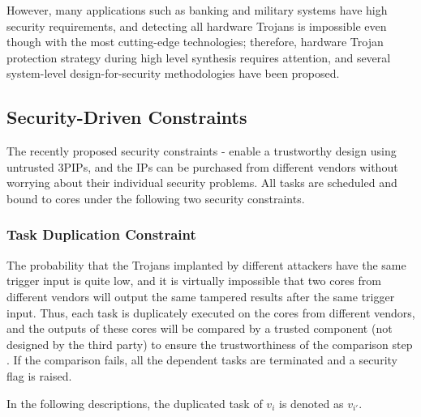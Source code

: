 \documentclass[10pt,journal]{IEEEtran}
\begin{document}

However, many applications such as banking and military systems have high security requirements, and detecting all hardware Trojans is impossible even though with the most cutting-edge technologies; therefore, hardware Trojan protection strategy during high level synthesis requires attention, and several system-level design-for-security methodologies have been proposed.



\subsection{Security-Driven Constraints}
\label{subsect:sec}
The recently proposed security constraints \cite{article:JR3}-\cite{article:NW} enable a trustworthy design using untrusted 3PIPs, and the IPs can be purchased from different vendors without worrying about their individual security problems. All tasks are scheduled and bound to cores under the following two security constraints.%


\subsubsection{\textbf{Task Duplication Constraint}}

The probability that the Trojans implanted by different attackers have the same trigger input is quite low, and it is virtually impossible that two cores from different vendors will output the same tampered results after the same trigger input. Thus, each task is duplicately executed on the cores from different vendors, and the outputs of these cores will be compared by a trusted component (not designed by the third party) to ensure the trustworthiness of the comparison step \cite{conference:DG}. If the comparison fails, all the dependent tasks are terminated and a security flag is raised.

In the following descriptions, the duplicated task of $v_i$ is denoted as $v_{i'}$.
\end{document}
